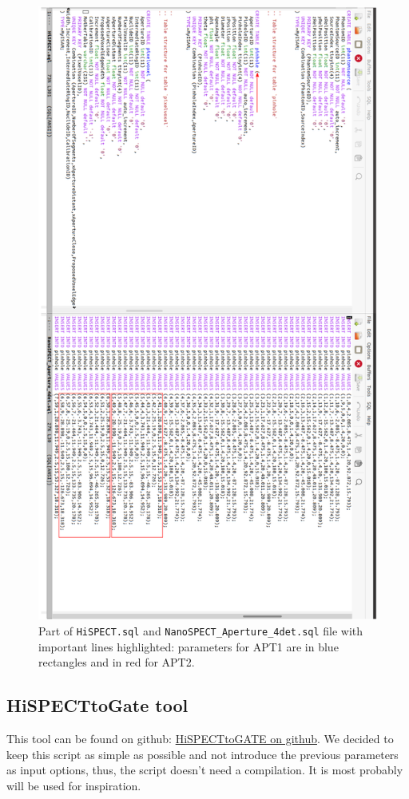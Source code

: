 \documentclass[12pt]{article}
\begin{document}
\begin{figure}[htp]
\centering
\includegraphics[scale=0.45]{figs/HiSPECTpinhole.png}
\caption{Part of \texttt{HiSPECT.sql} and \texttt{NanoSPECT\_Aperture\_4det.sql} file with important lines highlighted: parameters for APT1 are in blue rectangles and in red for APT2.}
\label{fig:HiSPECTpinhole}
\end{figure}

\clearpage
\subsection{HiSPECTtoGate tool}
This tool can be found on github: \href{https://github.com/kochebina/ParametrisedPinholeCollimator/tree/main/HiSPECTtoGATE}{HiSPECTtoGATE on github}. We decided to keep this script as simple as possible and not introduce the previous parameters as input options, thus, the script doesn't need a compilation. It is most probably will be used for inspiration.
\end{document}
